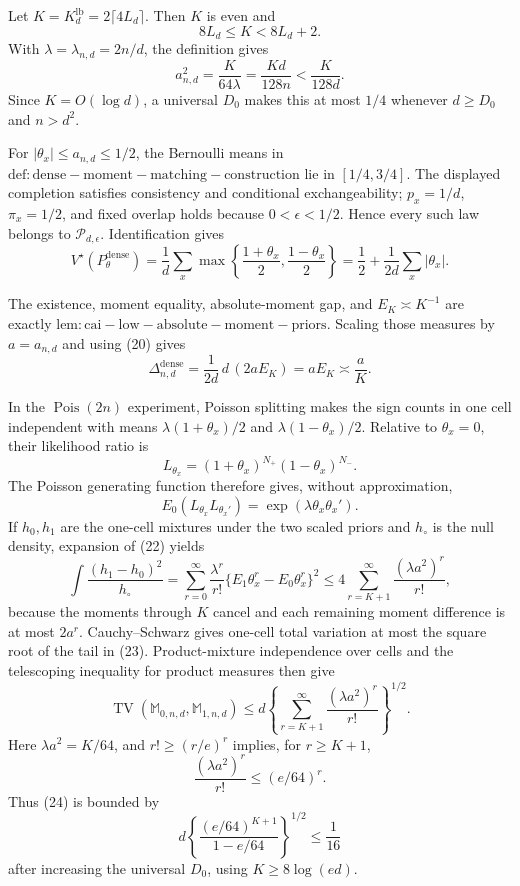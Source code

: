 Let \(K=K_d^{\mathrm{lb}}=2\lceil4L_d\rceil\).  Then \(K\) is even and
\[
 8L_d\leq K<8L_d+2.                                                    \tag{19}
\]
With \(\lambda=\lambda_{n,d}=2n/d\), the definition gives
\[
 a_{n,d}^2=\frac K{64\lambda}=\frac{Kd}{128n}<\frac K{128d}.
\]
Since \(K=O(\log d)\), a universal \(D_0\) makes this at most \(1/4\) whenever \(d\geq D_0\) and \(n>d^2\).

For \(|\theta_x|\leq a_{n,d}\leq1/2\), the Bernoulli means in \(\mathrm{def:dense-moment-matching-construction}\) lie in \([1/4,3/4]\).  The displayed completion satisfies consistency and conditional exchangeability; \(p_x=1/d\), \(\pi_x=1/2\), and fixed overlap holds because \(0<\epsilon<1/2\).  Hence every such law belongs to \(\mathcal P_{d,\epsilon}\).  Identification gives
\[
 V^\star(P_\theta^{\mathrm{dense}})
 =\frac1d\sum_x\max\left\{\frac{1+\theta_x}{2},\frac{1-\theta_x}{2}\right\}
 =\frac12+\frac1{2d}\sum_x|\theta_x|.                               \tag{20}
\]

The existence, moment equality, absolute-moment gap, and \(E_K\asymp K^{-1}\) are exactly \(\mathrm{lem:cai-low-absolute-moment-priors}\).  Scaling those measures by \(a=a_{n,d}\) and using (20) gives
\[
 \Delta_{n,d}^{\mathrm{dense}}
 =\frac1{2d}\,d\,(2aE_K)=aE_K\asymp\frac aK.                        \tag{21}
\]

In the \(\operatorname{Pois}(2n)\) experiment, Poisson splitting makes the sign counts in one cell independent with means \(\lambda(1+\theta_x)/2\) and \(\lambda(1-\theta_x)/2\).  Relative to \(\theta_x=0\), their likelihood ratio is
\[
 L_{\theta_x}=(1+\theta_x)^{N_+}(1-\theta_x)^{N_-}.
\]
The Poisson generating function therefore gives, without approximation,
\[
 E_0(L_{\theta_x}L_{\theta_x'})
 =\exp(\lambda\theta_x\theta_x').                                   \tag{22}
\]
If \(h_0,h_1\) are the one-cell mixtures under the two scaled priors and \(h_\circ\) is the null density, expansion of (22) yields
\[
 \int\frac{(h_1-h_0)^2}{h_\circ}
 =\sum_{r=0}^\infty\frac{\lambda^r}{r!}
   \{E_1\theta_x^r-E_0\theta_x^r\}^2
 \leq4\sum_{r=K+1}^\infty\frac{(\lambda a^2)^r}{r!},               \tag{23}
\]
because the moments through \(K\) cancel and each remaining moment difference is at most \(2a^r\).  Cauchy--Schwarz gives one-cell total variation at most the square root of the tail in (23).  Product-mixture independence over cells and the telescoping inequality for product measures then give
\[
 \operatorname{TV}(\mathbb M_{0,n,d},\mathbb M_{1,n,d})
 \leq d\left\{\sum_{r=K+1}^\infty\frac{(\lambda a^2)^r}{r!}\right\}^{1/2}. \tag{24}
\]
Here \(\lambda a^2=K/64\), and \(r!\geq(r/e)^r\) implies, for \(r\geq K+1\),
\[
 \frac{(\lambda a^2)^r}{r!}\leq(e/64)^r.
\]
Thus (24) is bounded by
\[
 d\left\{\frac{(e/64)^{K+1}}{1-e/64}\right\}^{1/2}\leq\frac1{16}  \tag{25}
\]
after increasing the universal \(D_0\), using \(K\geq8\log(ed)\).

